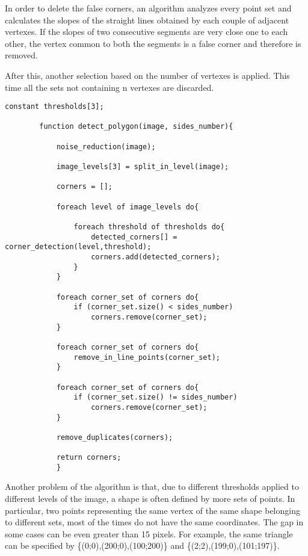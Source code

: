 		In order to delete the false corners, an algorithm analyzes every point set and calculates the slopes of the straight lines obtained by each couple of adjacent vertexes. 
		If the slopes of two consecutive segments are very close one to each other, the vertex common to both the segments is a false corner and therefore is removed.
		

		
		After this, another selection based on the number of vertexes is applied. This time all the sets not containing n vertexes are discarded.

	    	\begin{lstlisting}constant thresholds[3];	

		function detect_polygon(image, sides_number){

			noise_reduction(image);
		
			image_levels[3] = split_in_level(image);
		
			corners = [];
	
			foreach level of image_levels do{

				foreach threshold of thresholds do{
					detected_corners[] = corner_detection(level,threshold);
					corners.add(detected_corners);
				}
			}	
		
			foreach corner_set of corners do{
				if (corner_set.size() < sides_number)
					corners.remove(corner_set);
			}			

			foreach corner_set of corners do{
				remove_in_line_points(corner_set);
			}

			foreach corner_set of corners do{
				if (corner_set.size() != sides_number)
					corners.remove(corner_set);
			}

			remove_duplicates(corners);	
		
			return corners;
			}
			\end{lstlisting}
		

		
		


		
		
		
		
		Another problem of the algorithm is that, due to different thresholds applied to different levels of the image, a shape is often defined by more sets of points.
		In particular, two points representing the same vertex of the same shape belonging to different sets, most of the times do not have the same coordinates.
		The gap in some cases can be even greater than 15 pixels. 
		For example, the same triangle can be specified by \{(0;0),(200;0),(100;200)\} and \{(2;2),(199;0),(101;197)\}. 
		
